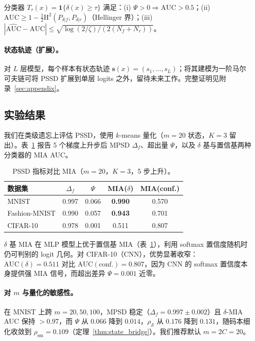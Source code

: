 \begin{theorem}
\label{thm:pssd_mia}
分类器 $T_\tau(x)=\mathbf{1}\{\delta(x)\ge\tau\}$ 满足：(i) $\Psi>0\Rightarrow\mathrm{AUC}>0.5$；(ii) $\mathrm{AUC}\ge1-\frac12\mathrm{H}^2(P_{\delta|f},P_{\delta|r})$（Hellinger 界）；(iii) $|\widehat{\mathrm{AUC}}-\mathrm{AUC}|\le\sqrt{\log(2/\zeta)/(2(N_f+N_r))}$。
\end{theorem}

\paragraph{状态轨迹（扩展）。}
对 $L$ 层模型，每个样本有状态轨迹 $\mathbf{s}(x)=(s_1,\dots,s_L)$；将其建模为一阶马尔可夫链可将 PSSD 扩展到单层 logits 之外，留待未来工作。完整证明见附录~\ref{sec:appendix}。

\subsection{实验结果}

我们在类级遗忘上评估 PSSD，使用 $k$-means 量化（$m{=}20$ 状态，$K{=}3$ 留出）。表~\ref{tab:pssd_results} 报告 5 个梯度上升步后 MPSD $\Delta_f$、超出量 $\Psi$，以及 $\delta$ 基与置信基两种分类器的 MIA AUC。

\begin{table}[t]
\centering
\small
\caption{PSSD 指标对比 MIA（$m{=}20$，$K{=}3$，5 步上升）。}\label{tab:pssd_results}
\setlength{\tabcolsep}{2pt}
\begin{tabular}{l c c c c}
\toprule
数据集 & $\Delta_f$ & $\Psi$ & MIA($\delta$) & MIA(conf.) \\
\midrule
MNIST & 0.997 & 0.066 & \textbf{0.990} & 0.570 \\
Fashion-MNIST & 0.990 & 0.057 & \textbf{0.943} & 0.701 \\
CIFAR-10 & 0.978 & 0.001 & 0.511 & 0.807 \\
\bottomrule
\end{tabular}
\end{table}

$\delta$ 基 MIA 在 MLP 模型上优于置信基 MIA（表~\ref{tab:pssd_results}），利用 softmax 置信度随机时仍可判别的 logit 几何。对 CIFAR-10（CNN），优势显著收窄：$\mathrm{AUC}(\delta){=}0.511$ 对比 $\mathrm{AUC}(\mathrm{conf.}){=}0.807$，因为 CNN 的 softmax 置信度本身提供强 MIA 信号，而超出差异 $\Psi{=}0.001$ 近零。

\paragraph{对 $m$ 与量化的敏感性。}在 MNIST 上跨 $m{=}20,50,100$，MPSD 稳定（$\Delta_f{=}0.997{\pm}0.002$）且 $\delta$-MIA AUC 保持 $>0.97$，而 $\Psi$ 从 $0.066$ 降到 $0.014$，$\rho_{\mathcal{S}}$ 从 $0.176$ 降到 $0.131$，随码本细化收敛到 $\rho_{\mathrm{sm}}{=}0.109$（定理~\ref{thm:state_bridge}）。我们推荐默认 $m{=}2C{=}20$。

